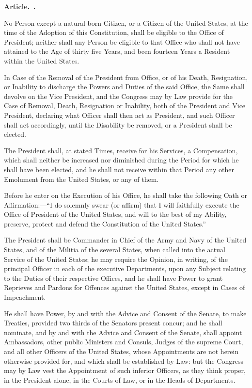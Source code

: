 \documentclass[12pt]{article}
\newcommand{\q}[1]{\enquote{#1}}
\newcounter{article}
\newenvironment{article}
{\stepcounter{article}\setcounter{sect}{0}\begin{center}
{\bf Article.~\Roman{article}.}
\end{center}}
{}
\newcounter{sect}[article]
\newenvironment{sect}
{\stepcounter{sect}{\bf Section.~\arabic{sect}.}}
{}
\begin{document}
\begin{article}
\begin{sect}
No Person except a natural born Citizen, or a Citizen of the United States, at the time of the Adoption of this Constitution, shall be eligible to the Office of President; neither shall any Person be eligible to that Office who shall not have attained to the Age of thirty five Years, and been fourteen Years a Resident within the United States.

In Case of the Removal of the President from Office, or of his Death, Resignation, or Inability to discharge the Powers and Duties of the said Office, the Same shall devolve on the Vice President, and the Congress may by Law provide for the Case of Removal, Death, Resignation or Inability, both of the President and Vice President, declaring what Officer shall then act as President, and such Officer shall act accordingly, until the Disability be removed, or a President shall be elected.

The President shall, at stated Times, receive for his Services, a Compensation, which shall neither be increased nor diminished during the Period for which he shall have been elected, and he shall not receive within that Period any other Emolument from the United States, or any of them.

Before he enter on the Execution of his Office, he shall take the following Oath or Affirmation:---\q{I do solemnly swear (or affirm) that I will faithfully execute the Office of President of the United States, and will to the best of my Ability, preserve, protect and defend the Constitution of the United States.}
\end{sect}

\begin{sect}
The President shall be Commander in Chief of the Army and Navy of the United States, and of the Militia of the several States, when called into the actual Service of the United States; he may require the Opinion, in writing, of the principal Officer in each of the executive Departments, upon any Subject relating to the Duties of their respective Offices, and he shall have Power to grant Reprieves and Pardons for Offences against the United States, except in Cases of Impeachment.

He shall have Power, by and with the Advice and Consent of the Senate, to make Treaties, provided two thirds of the Senators present concur; and he shall nominate, and by and with the Advice and Consent of the Senate, shall appoint Ambassadors, other public Ministers and Consuls, Judges of the supreme Court, and all other Officers of the United States, whose Appointments are not herein otherwise provided for, and which shall be established by Law: but the Congress may by Law vest the Appointment of such inferior Officers, as they think proper, in the President alone, in the Courts of Law, or in the Heads of Departments.


\end{sect}
\end{article}
\end{document}
